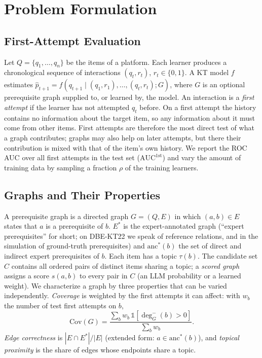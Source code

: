 \documentclass[lettersize,journal]{IEEEtran}
\newcommand{\aucfa}{\mathrm{AUC}^{\mathrm{1st}}}
\begin{document}
\section{Problem Formulation}
\subsection{First-Attempt Evaluation}
Let $Q=\{q_1,\dots,q_n\}$ be the items of a platform. Each learner produces a chronological sequence of interactions $(q_t, r_t)$, $r_t\in\{0,1\}$. A KT model $f$ estimates $\hat p_{t+1}=f(q_{t+1}\mid (q_1,r_1),\dots,(q_t,r_t);G)$, where $G$ is an optional prerequisite graph supplied to, or learned by, the model. An interaction is a \emph{first attempt} if the learner has not attempted $q_t$ before. On a first attempt the history contains no information about the target item, so any information about it must come from other items. First attempts are therefore the most direct test of what a graph contributes; graphs may also help on later attempts, but there their contribution is mixed with that of the item's own history. We report the ROC AUC over all first attempts in the test set ($\aucfa$) and vary the amount of training data by sampling a fraction $\rho$ of the training learners.

\subsection{Graphs and Their Properties}
A prerequisite graph is a directed graph $G=(Q,E)$ in which $(a,b)\in E$ states that $a$ is a prerequisite of $b$. $E^*$ is the expert-annotated graph (``expert prerequisites'' for short; on DBE-KT22 we speak of reference relations, and in the simulation of ground-truth prerequisites) and $\mathrm{anc}^*(b)$ the set of direct and indirect expert prerequisites of $b$. Each item has a topic $\tau(b)$. The candidate set $C$ contains all ordered pairs of distinct items sharing a topic; a \emph{scored graph} assigns a score $s(a,b)$ to every pair in $C$ (an LLM probability or a learned weight). We characterize a graph by three properties that can be varied independently. \emph{Coverage} is weighted by the first attempts it can affect: with $w_b$ the number of test first attempts on $b$,
\begin{equation}
\mathrm{Cov}(G)=\frac{\sum_b w_b\,\mathbb{1}[\deg^-_G(b)>0]}{\sum_b w_b}.
\end{equation}
\emph{Edge correctness} is $|E\cap E^*|/|E|$ (extended form: $a\in\mathrm{anc}^*(b)$), and \emph{topical proximity} is the share of edges whose endpoints share a topic.
\end{document}
